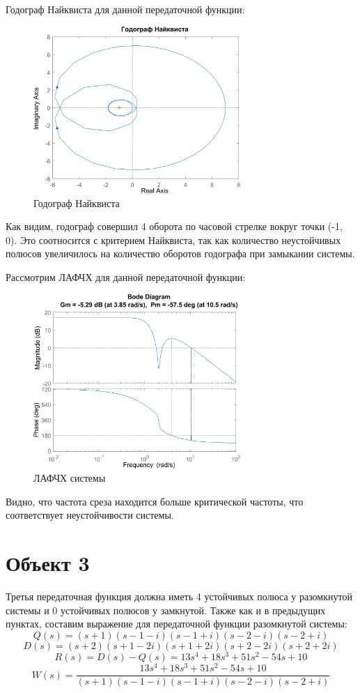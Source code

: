 Годограф Найквиста для данной передаточной функции:
\begin{figure}[H]
    \centering
    \includegraphics[width=0.7\textwidth, trim={0cm 0cm 0cm 0cm}]{../images/1_2_hod.png}
    \caption{Годограф Найквиста}
\end{figure}

Как видим, годограф совершил 4 оборота по часовой стрелке вокруг точки (-1, 0). Это соотносится с критерием Найквиста, так как
количество неустойчивых полюсов увеличилось на количество оборотов годографа при замыкании системы.

Рассмотрим ЛАФЧХ для данной передаточной функции:
\begin{figure}[H]
    \centering
    \includegraphics[width=0.7\textwidth, trim={0cm 0cm 0cm 0cm}]{../images/1_2_lapfs.png}
    \caption{ЛАФЧХ системы}
\end{figure}

Видно, что частота среза находится больше критической частоты, что соответствует неустойчивости системы.

\section{Объект 3}
Третья передаточная функция должна иметь 4 устойчивых полюса у разомкнутой системы и 0 устойчивых полюсов у замкнутой.
Также как и в предыдущих пунктах, составим выражение для передаточной функции разомкнутой системы:
\[
Q(s) = (s+1)(s-1-i)(s-1+i)(s-2-i)(s-2+i)
\]
\[
D(s) = (s+2)(s+1-2i)(s+1+2i)(s+2-2i)(s+2+2i)
\]
\[
R(s) = D(s) - Q(s) = 13s^4 + 18s^3 + 51s^2 - 54s + 10
\]
\[
W(s) = \frac{13s^4 + 18s^3 + 51s^2 - 54s + 10}{(s+1)(s-1-i)(s-1+i)(s-2-i)(s-2+i)}
\]

